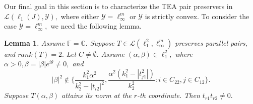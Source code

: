 \documentclass{amsart}
\newtheorem{lemma}[theorem]{Lemma}
\theoremstyle{definition}
\theoremstyle{remark}
\numberwithin{equation}{section}
\begin{document}
Our final goal in this section is to characterize the TEA pair preservers in $\mathcal{L}(\ell_1(J),\mathcal{Y}),$ where either $\mathcal{Y}=\ell_\infty^m$ or $\mathcal{Y}$ is strictly convex.   To consider the case $\mathcal{Y}=\ell_\infty^m,$ we need the following lemma.

\begin{lemma}\label{lem-tea}
Assume $\mathbb{F}=\mathbb{C}.$	Suppose $T\in \mathcal{L}(\ell_1^2, \ell_\infty^m)$ preserves parallel pairs, and $rank(T)=2.$ Let $C\neq \emptyset.$ 
Assume $(\alpha,\beta)\in \ell_1^2,$ where $\alpha>0,\beta=|\beta|e^{i\theta}\neq 0,$ and $$|\beta|^2\notin\Big\{\frac{k_1^2\alpha^2}{k_2^2-|t_{i2}|^2}, \frac{\alpha^2(k_1^2-|t_{j1}^2|)}{k_2^2}:i\in C_{22},j\in C_{12}\Big\}.$$ %
Suppose $T(\alpha,\beta)$ attains its norm at the $r$-th coordinate. Then $t_{r1}t_{r2}\neq 0.$
\end{lemma}
\end{document}
